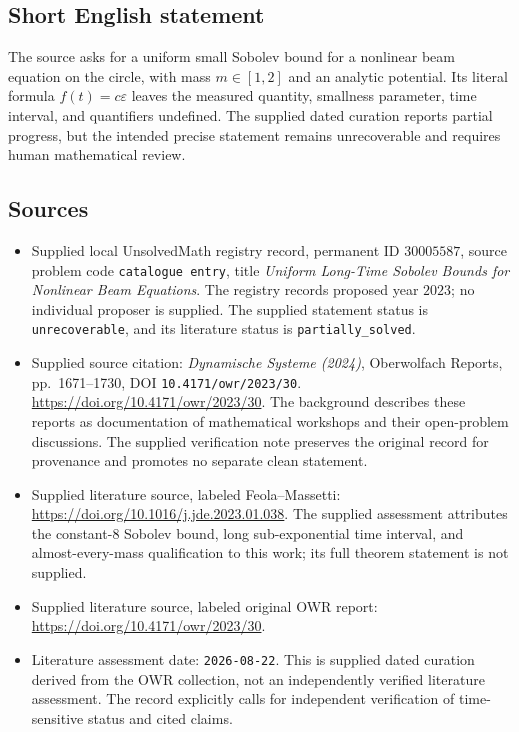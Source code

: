 \documentclass[11pt]{article}
\begin{document}
\subsection{Short English statement}
The source asks for a uniform small Sobolev bound for a nonlinear beam equation on the circle, with mass \(m\in[1,2]\) and an analytic potential. Its literal formula \(f(t)=c\varepsilon\) leaves the measured quantity, smallness parameter, time interval, and quantifiers undefined. The supplied dated curation reports partial progress, but the intended precise statement remains unrecoverable and requires human mathematical review.
\subsection{Sources}
\begin{itemize}
\item Supplied local UnsolvedMath registry record, permanent ID \(30005587\), source problem code \texttt{catalogue entry}, title \emph{Uniform Long-Time Sobolev Bounds for Nonlinear Beam Equations}. The registry records proposed year \(2023\); no individual proposer is supplied. The supplied statement status is \texttt{unrecoverable}, and its literature status is \texttt{partially\_solved}.
\item Supplied source citation: \emph{Dynamische Systeme (2024)}, Oberwolfach Reports, pp.~1671--1730, DOI \texttt{10.4171/owr/2023/30}. \url{https://doi.org/10.4171/owr/2023/30}. The background describes these reports as documentation of mathematical workshops and their open-problem discussions. The supplied verification note preserves the original record for provenance and promotes no separate clean statement.
\item Supplied literature source, labeled Feola--Massetti: \url{https://doi.org/10.1016/j.jde.2023.01.038}. The supplied assessment attributes the constant-\(8\) Sobolev bound, long sub-exponential time interval, and almost-every-mass qualification to this work; its full theorem statement is not supplied.
\item Supplied literature source, labeled original OWR report: \url{https://doi.org/10.4171/owr/2023/30}.
\item Literature assessment date: \texttt{2026-08-22}. This is supplied dated curation derived from the OWR collection, not an independently verified literature assessment. The record explicitly calls for independent verification of time-sensitive status and cited claims.
\end{itemize}
\end{document}
